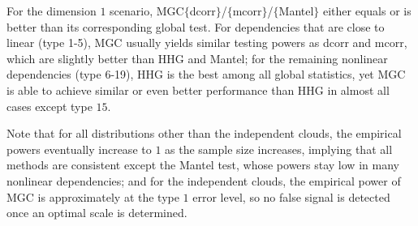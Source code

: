 \documentclass[11pt]{article}
\begin{document}
For the dimension $1$ scenario, MGC$\{$dcorr$\}$/$\{$mcorr$\}$/$\{$Mantel$\}$ either equals or is better than its corresponding global test. For dependencies that are close to linear (type 1-5), MGC usually yields similar testing powers as dcorr and mcorr, which are slightly better than HHG and Mantel; for the remaining nonlinear dependencies (type 6-19), HHG is the best among all global statistics, yet MGC is able to achieve similar or even better performance than HHG in almost all cases except type $15$. 

Note that for all distributions other than the independent clouds, the empirical powers eventually increase to $1$ as the sample size increases, implying that all methods are consistent except the Mantel test, whose powers stay low in many nonlinear dependencies; and for the independent clouds, the empirical power of MGC is approximately at the type $1$ error level, so no false signal is detected once an optimal scale is determined. 
\end{document}

